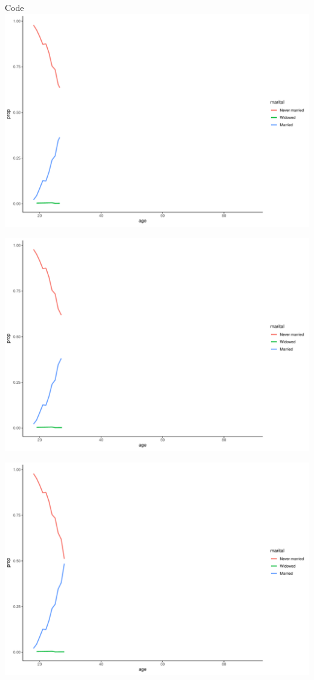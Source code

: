\documentclass[
  ignorenonframetext,
]{beamer}
\begin{document}
\begin{frame}[fragile]{Code}
\includegraphics{gss_cat_files/figure-beamer/unnamed-chunk-1-17.pdf}

\includegraphics{gss_cat_files/figure-beamer/unnamed-chunk-1-18.pdf}

\includegraphics{gss_cat_files/figure-beamer/unnamed-chunk-1-19.pdf}


\end{frame}
\end{document}
